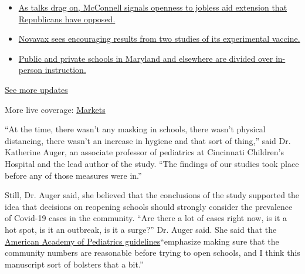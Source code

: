 \begin{itemize}
\tightlist
\item
  \href{https://www.nytimes3xbfgragh.onion/2020/08/04/world/coronavirus-cases.html?action=click\&pgtype=Article\&state=default\&region=MAIN_CONTENT_1\&context=storylines_live_updates\#link-2daa96b5}{As
  talks drag on, McConnell signals openness to jobless aid extension
  that Republicans have opposed.}
\item
  \href{https://www.nytimes3xbfgragh.onion/2020/08/04/world/coronavirus-cases.html?action=click\&pgtype=Article\&state=default\&region=MAIN_CONTENT_1\&context=storylines_live_updates\#link-1228a480}{Novavax
  sees encouraging results from two studies of its experimental
  vaccine.}
\item
  \href{https://www.nytimes3xbfgragh.onion/2020/08/04/world/coronavirus-cases.html?action=click\&pgtype=Article\&state=default\&region=MAIN_CONTENT_1\&context=storylines_live_updates\#link-4825b93}{Public
  and private schools in Maryland and elsewhere are divided over
  in-person instruction.}
\end{itemize}

\href{https://www.nytimes3xbfgragh.onion/2020/08/04/world/coronavirus-cases.html?action=click\&pgtype=Article\&state=default\&region=MAIN_CONTENT_1\&context=storylines_live_updates}{See
more updates}

More live coverage:
\href{https://www.nytimes3xbfgragh.onion/live/2020/08/04/business/stock-market-today-coronavirus?action=click\&pgtype=Article\&state=default\&region=MAIN_CONTENT_1\&context=storylines_live_updates}{Markets}

``At the time, there wasn't any masking in schools, there wasn't
physical distancing, there wasn't an increase in hygiene and that sort
of thing,'' said Dr. Katherine Auger, an associate professor of
pediatrics at Cincinnati Children's Hospital and the lead author of the
study. ``The findings of our studies took place before any of those
measures were in.''

Still, Dr. Auger said, she believed that the conclusions of the study
supported the idea that decisions on reopening schools should strongly
consider the prevalence of Covid-19 cases in the community. ``Are there
a lot of cases right now, is it a hot spot, is it an outbreak, is it a
surge?'' Dr. Auger said. She said that the
\href{https://mailcastr.com/links/t/MTExMDY2Ojo6MjRkZTk2ZWM3NjNiNDVlNjg1NGI2ZWNhM2MwMmJlNGU6OnYzOjoxNTk1OTg4MDMyOjox/brMxW}{American
Academy of Pediatrics guidelines}``emphasize making sure that the
community numbers are reasonable before trying to open schools, and I
think this manuscript sort of bolsters that a bit.''

